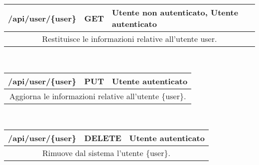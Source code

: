 \begin{table}[h]
	\begin{tabular}{|p{}|p{}|p{}|}
		\toprule
		\textbf{/api/user/\{user\}} & \textbf{GET} & \textbf{Utente non autenticato, Utente autenticato} \\ \midrule
		\multicolumn{3}{|c|}{Restituisce le informazioni relative all'utente {user}.} \\
		\bottomrule
	\end{tabular}\\
	\par\bigskip
	
	\begin{tabular}{|p{}|p{}|p{}|}
		\toprule
		\textbf{/api/user/\{user\}} & \textbf{PUT} & \textbf{Utente autenticato} \\ \midrule
		\multicolumn{3}{|c|}{Aggiorna le informazioni relative all'utente \{user\}.} \\
		\bottomrule
	\end{tabular}\\
	\par\bigskip
		
	\begin{tabular}{|p{}|p{}|p{}|}
		\toprule
		\textbf{/api/user/\{user\}} & \textbf{DELETE} & \textbf{Utente autenticato} \\ \midrule
		\multicolumn{3}{|c|}{Rimuove dal sistema l'utente \{user\}.} \\
		\bottomrule
	\end{tabular}\\
	\par\bigskip
	
	
\end{table}
\newpage	
